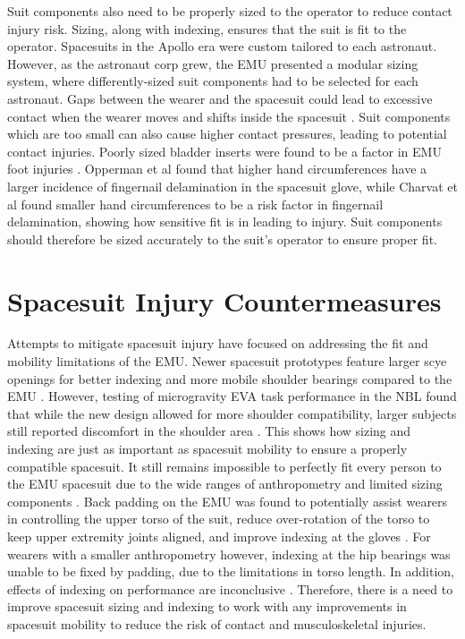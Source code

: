 \documentclass[defaultstyle,11pt]{comps}
\begin{document}
Suit components also need to be properly sized to the operator to reduce contact injury risk.
Sizing, along with indexing, ensures that the suit is fit to the operator.
Spacesuits in the Apollo era were custom tailored to each astronaut.
However, as the astronaut corp grew, the EMU presented a modular sizing system, where differently-sized suit components had to be selected for each astronaut.
Gaps between the wearer and the spacesuit could lead to excessive contact when the wearer moves and shifts inside the spacesuit \citep{Benson2009}.
Suit components which are too small can also cause higher contact pressures, leading to potential contact injuries.
Poorly sized bladder inserts were found to be a factor in EMU foot injuries \citep{Strauss2004}. Opperman et al \citep{Opperman2010} found that higher hand circumferences have a larger incidence of fingernail delamination in the spacesuit glove, while Charvat et al \citep{Charvat2015} found smaller hand circumferences to be a risk factor in fingernail delamination, showing how sensitive fit is in leading to injury.
Suit components should therefore be sized accurately to the suit's operator to ensure proper fit.

\hypertarget{spacesuit-injury-countermeasures}{%
\section{Spacesuit Injury Countermeasures}\label{spacesuit-injury-countermeasures}}

Attempts to mitigate spacesuit injury have focused on addressing the fit and mobility limitations of the EMU.
Newer spacesuit prototypes feature larger scye openings for better indexing and more mobile shoulder bearings compared to the EMU \citep{Graziosi2016}.
However, testing of microgravity EVA task performance in the NBL found that while the new design allowed for more shoulder compatibility, larger subjects still reported discomfort in the shoulder area \citep{Meginnis2018}.
This shows how sizing and indexing are just as important as spacesuit mobility to ensure a properly compatible spacesuit.
It still remains impossible to perfectly fit every person to the EMU spacesuit due to the wide ranges of anthropometry and limited sizing components \citep{Benson2009}.
Back padding on the EMU was found to potentially assist wearers in controlling the upper torso of the suit, reduce over-rotation of the torso to keep upper extremity joints aligned, and improve indexing at the gloves \citep{Chappell2017}.
For wearers with a smaller anthropometry however, indexing at the hip bearings was unable to be fixed by padding, due to the limitations in torso length.
In addition, effects of indexing on performance are inconclusive \citep{Fineman2018}.
Therefore, there is a need to improve spacesuit sizing and indexing to work with any improvements in spacesuit mobility to reduce the risk of contact and musculoskeletal injuries.
\end{document}
